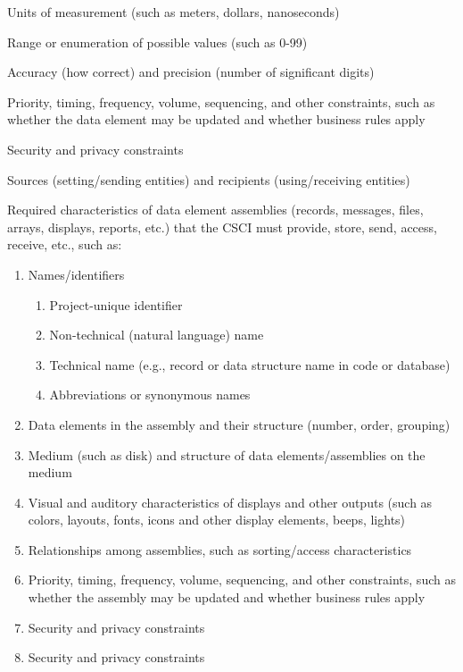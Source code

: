 \documentclass{fidata-report-template}
\begin{document}
Units of measurement (such as meters, dollars, nanoseconds)

Range or enumeration of possible values (such as 0-99)

Accuracy (how correct) and precision (number of significant digits)

Priority, timing, frequency, volume, sequencing, and other constraints,
such as whether the data element may be updated and whether business
rules apply

Security and privacy constraints

Sources (setting/sending entities) and recipients (using/receiving
entities)

Required characteristics of data element assemblies (records, messages,
files, arrays, displays, reports, etc.) that the CSCI must provide,
store, send, access, receive, etc., such as:

\begin{enumerate}
\itemsep1pt\parskip0pt
\item
  Names/identifiers

  \begin{enumerate}
  \itemsep1pt\parskip0pt
  \item
    Project-unique identifier
  \item
    Non-technical (natural language) name
  \item
    Technical name (e.g., record or data structure name in code or
    database)
  \item
    Abbreviations or synonymous names
  \end{enumerate}
\item
  Data elements in the assembly and their structure (number, order,
  grouping)
\item
  Medium (such as disk) and structure of data elements/assemblies on the
  medium
\item
  Visual and auditory characteristics of displays and other outputs
  (such as colors, layouts, fonts, icons and other display elements,
  beeps, lights)
\item
  Relationships among assemblies, such as sorting/access characteristics
\item
  Priority, timing, frequency, volume, sequencing, and other
  constraints, such as whether the assembly may be updated and whether
  business rules apply
\item
  Security and privacy constraints
\item
  Security and privacy constraints
\end{enumerate}
\end{document}

